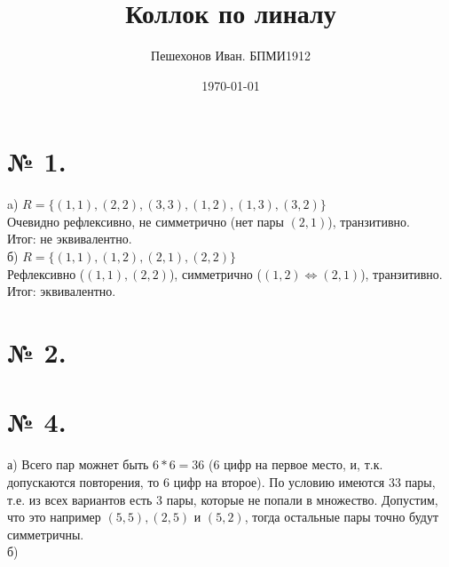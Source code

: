 \documentclass[a4paper,11pt]{report}
\title{Коллок по линалу}
\author{Пешехонов Иван. БПМИ1912}
\date{\today}
\begin{document}
\section{№ 1.}
a) $R = \{(1, 1), (2, 2), (3, 3), (1, 2), (1, 3), (3, 2)\}$\\
Очевидно рефлексивно, не симметрично (нет пары $(2, 1)$), транзитивно.\\
Итог: не эквивалентно.\\
б) $R = \{(1, 1), (1, 2), (2, 1), (2, 2)\}$\\
Рефлексивно ($(1, 1), (2, 2)$), симметрично ($(1, 2) \Leftrightarrow (2, 1)$), транзитивно.\\
Итог: эквивалентно.
\section{№ 2.}
\section{№ 4.}
а) Всего пар можнет быть $6 * 6 = 36$ (6 цифр на первое место, и, т.к. допускаются повторения, то 6 цифр на второе).
По условию имеются 33 пары, т.е. из всех вариантов есть 3 пары, которые не попали в множество. Допустим, что это
например $(5, 5), (2, 5)$ и $(5, 2)$, тогда остальные пары точно будут симметричны.\\
б) 
\end{document}

